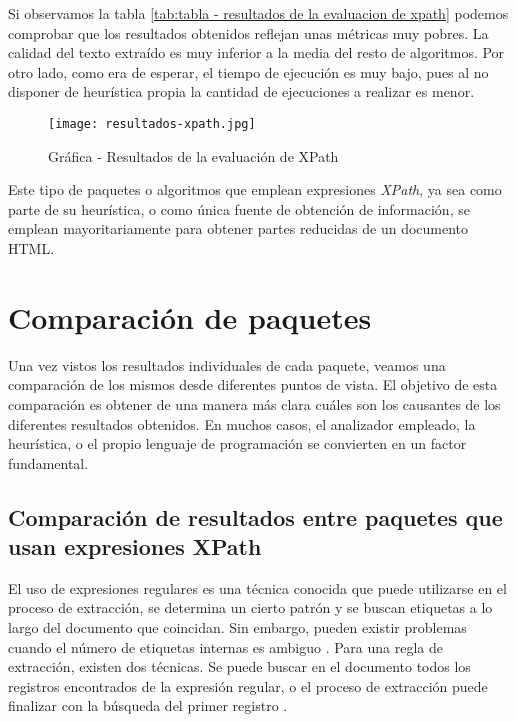 Si observamos la tabla \ref{tab:tabla - resultados de la evaluacion de xpath} podemos comprobar que los
resultados obtenidos reflejan unas métricas muy pobres. La calidad del texto extraído es muy inferior a la
media del resto de algoritmos. Por otro lado, como era de esperar, el tiempo de ejecución es muy bajo, pues
al no disponer de heurística propia la cantidad de ejecuciones a realizar es menor.

\begin{figure}[tphb]
    \centering
    \texttt{[image: resultados-xpath.jpg]}
    \caption{Gráfica - Resultados de la evaluación de XPath}
    \label{img:grafica - resultados de la evaluacion de xpath}
\end{figure}

Este tipo de paquetes o algoritmos que emplean expresiones \emph{XPath}, ya sea como parte de su heurística,
o como única fuente de obtención de información, se emplean mayoritariamente para obtener partes reducidas
de un documento HTML.

\section{Comparación de paquetes}
\label{sec:comparacion de paquetes}

Una vez vistos los resultados individuales de cada paquete, veamos una comparación de los mismos desde
diferentes puntos de vista. El objetivo de esta comparación es obtener de una manera más clara cuáles son
los causantes de los diferentes resultados obtenidos. En muchos casos, el analizador empleado, la heurística,
o el propio lenguaje de programación se convierten en un factor fundamental.

\subsection{Comparación de resultados entre paquetes que usan expresiones XPath}
\label{subsec:comparacion de resultados entre paquetes que usan expresiones xpath}

El uso de expresiones regulares es una técnica conocida que puede utilizarse en el proceso de extracción,
se determina un cierto patrón y se buscan etiquetas a lo largo del documento que coincidan. Sin embargo,
pueden existir problemas cuando el número de etiquetas internas es ambiguo \cite{uzun}. Para una regla de 
extracción, existen dos técnicas. Se puede buscar en el documento todos los registros encontrados de la 
expresión regular, o el proceso de extracción puede finalizar con la búsqueda del primer registro \cite{regex}.

